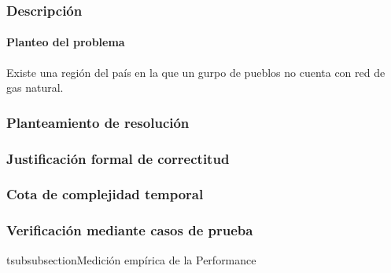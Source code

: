 \documentclass[11pt, a4paper, twoside]{article}
\begin{document}
{}

\subsubsection{Descripción}\label{subsubsec:ej2-descripcion}

\paragraph*{Planteo del problema}
  Existe una región del país en la que un gurpo de pueblos no cuenta con 
  red de gas natural.

\subsubsection{Planteamiento de resolución}\label{subsubsec:ej2-resolucion}


\subsubsection{Justificación formal de correctitud}\label{subsubsec:ej2-correctitud}


\subsubsection{Cota de complejidad temporal}\label{subsubsec:ej2-cotatemporal}


\subsubsection{Verificación mediante casos de prueba}\label{subsubsec:ej2-casosdeprueba}


tsubsubsection{Medición empírica de la Performance}\label{subsubsec:ej2-performance}

\end{document}
